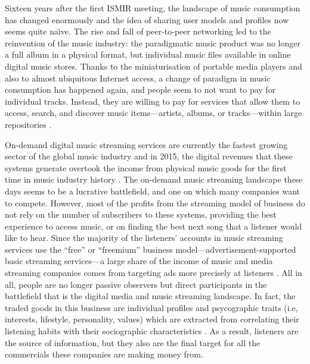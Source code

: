 Sixteen years after the first ISMIR meeting, the landscape of music consumption has changed enormously and the idea of sharing user models and profiles now seems quite na\"{\i}ve.  The rise and fall of peer-to-peer networking led to the reinvention of the music industry: the paradigmatic music pro\-duct was no longer a full album in a physical format, but individual music files available in online digital music stores. 
Thanks to the miniaturisation of portable media players and also to almost ubiquitous Internet access, a change of paradigm in music consumption has happened again, and people seem to not want to pay for individual tracks. Instead, they are willing to pay for services that allow them to access, search, and discover music items---artists, albums, or tracks---within large repositories \autocite{wikstrom13music}. 

On-demand digital music streaming services are currently the fastest growing sector of the global music industry \autocite{ifpi15global} and in 2015, the digi\-tal revenues that these systems generate overtook the income from physical music goods for the first time in music industry history \autocite{ifpi16global}. 
The on-demand music streaming landscape these days seems to be a lucrative battlefield, and one on which many companies want to compete.
However, most of the profits from the streaming model of business do not rely on the number of subscribers to these systems, providing the best experience to access music, or on finding the best next song that a listener would like to hear. 
Since the majority of the listeners' accounts in music streaming services use the ``free'' or ``freemium'' business model---advertisement-supported basic streaming services---a large share of the income of music and media streaming companies comes from targeting ads more precisely at listeners \autocite{rutter16music}.
All in all, people are no longer passive observers but direct participants in the battlefield that is the digital media and music streaming landscape.
In fact, the traded goods in this business are individual profiles and psycographic traits (i.e, interests, lifestyle, personality, values) which are extracted from correlating their listening habits with their sociographic characteristics \autocite{prey16musica}. 
As a result, listeners are the source of information, but they also are the final target for all the commercials these companies are making money from. 


